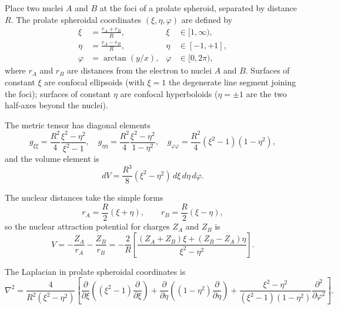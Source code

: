 \documentclass[aps,pra,twocolumn,superscriptaddress,longbibliography]{revtex4-2}
\begin{document}
Place two nuclei $A$ and $B$ at the foci of a prolate spheroid,
separated by distance $R$.  The prolate spheroidal coordinates
$(\xi, \eta, \varphi)$ are defined by
\begin{align}
  \xi  &= \frac{r_A + r_B}{R}, & \xi &\in [1, \infty), \label{eq:xi_def} \\
  \eta &= \frac{r_A - r_B}{R}, & \eta &\in [-1, +1], \label{eq:eta_def} \\
  \varphi &= \arctan(y/x),     & \varphi &\in [0, 2\pi), \label{eq:phi_def}
\end{align}
where $r_A$ and $r_B$ are distances from the electron to nuclei $A$
and $B$.  Surfaces of constant $\xi$ are confocal ellipsoids (with
$\xi = 1$ the degenerate line segment joining the foci); surfaces
of constant $\eta$ are confocal hyperboloids ($\eta = \pm 1$ are
the two half-axes beyond the nuclei).

The metric tensor has diagonal elements
\begin{equation}
  g_{\xi\xi} = \frac{R^2}{4} \frac{\xi^2 - \eta^2}{\xi^2 - 1},
  \quad
  g_{\eta\eta} = \frac{R^2}{4} \frac{\xi^2 - \eta^2}{1 - \eta^2},
  \quad
  g_{\varphi\varphi} = \frac{R^2}{4}(\xi^2 - 1)(1 - \eta^2),
  \label{eq:metric}
\end{equation}
and the volume element is
\begin{equation}
  dV = \frac{R^3}{8}(\xi^2 - \eta^2)\,d\xi\,d\eta\,d\varphi.
  \label{eq:volume}
\end{equation}

The nuclear distances take the simple forms
\begin{equation}
  r_A = \frac{R}{2}(\xi + \eta), \qquad
  r_B = \frac{R}{2}(\xi - \eta),
  \label{eq:nuclear_distances}
\end{equation}
so the nuclear attraction potential for charges $Z_A$ and $Z_B$ is
\begin{equation}
  V = -\frac{Z_A}{r_A} - \frac{Z_B}{r_B}
    = -\frac{2}{R}\left[
        \frac{(Z_A + Z_B)\xi + (Z_B - Z_A)\eta}{\xi^2 - \eta^2}
      \right].
  \label{eq:potential}
\end{equation}

The Laplacian in prolate spheroidal coordinates is
\begin{equation}
  \nabla^2 = \frac{4}{R^2(\xi^2 - \eta^2)}
  \left[
    \frac{\partial}{\partial\xi}\!\left((\xi^2\!-\!1)\frac{\partial}{\partial\xi}\right)
    + \frac{\partial}{\partial\eta}\!\left((1\!-\!\eta^2)\frac{\partial}{\partial\eta}\right)
    + \frac{\xi^2\!-\!\eta^2}{(\xi^2\!-\!1)(1\!-\!\eta^2)}\frac{\partial^2}{\partial\varphi^2}
  \right].
  \label{eq:laplacian}
\end{equation}
\end{document}
